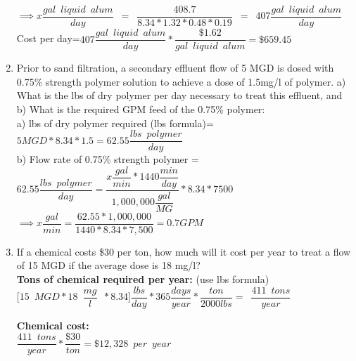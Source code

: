 \begin{enumerate}
\vspace{0.25cm}
$ \implies x \dfrac{gal \enspace liquid \enspace alum}{day}\enspace = \enspace \dfrac{408.7}{8.34*1.32*0.48*0.19} \enspace = \enspace 407 \dfrac{gal \enspace liquid \enspace alum}{day}$\\
\vspace{0.25cm}
Cost per day=$407 \dfrac{gal \enspace liquid \enspace alum}{day}*\dfrac{\$1.62}{gal \enspace liquid \enspace alum}=\boxed{\$659.45}$
\vspace{0.25cm}
\item Prior to sand filtration, a secondary effluent flow of 5 MGD is dosed with 0.75\% strength polymer solution to achieve a dose of 1.5mg/l of polymer.  a) What is the lbs of dry polymer per day necessary to treat this effluent, and b) What is the required GPM feed of the 0.75\% polymer:\\
\vspace{0.25cm}
a)  lbs of dry polymer required (lbs formula)=$5MGD*8.34*1.5=\boxed{62.55 \dfrac{lbs \enspace polymer}{day}}$\\
\vspace{0.25cm}
b) Flow rate of 0.75\% strength polymer = $62.55 \dfrac{lbs \enspace polymer}{day}=\dfrac{x \dfrac{gal}{min}*1440\dfrac{min}{day}}{1,000,000\dfrac{gal}{MG}}*8.34*7500$\\
$ \implies x \dfrac{gal}{min}=\dfrac{62.55*1,000,000}{1440*8.34*7,500}=\boxed{0.7GPM}$\\
\vspace{0.3cm}

\item If a chemical costs \$30 per ton, how much will it cost per year to treat a flow of 15 MGD if the average dose is 18 mg/l?\\

\textbf{Tons of chemical required per year:} (use lbs formula)\\
\vspace{0.25cm}
 $\Big[15 \enspace MGD * 18 \enspace \dfrac{mg}{l}\enspace*8.34\Big]\dfrac{lbs}{day}* 365 \dfrac{days}{year}*\dfrac{ton}{2000lbs}=\enspace \dfrac{411 \enspace tons}{year}$

\textbf{Chemical cost:}\\
\vspace{0.25cm}
$\dfrac{411 \enspace tons}{year}*\dfrac{\$30}{ton}=\boxed{\$12,328 \enspace per \enspace year}$\\
\vspace{0.25cm}

\end{enumerate}



